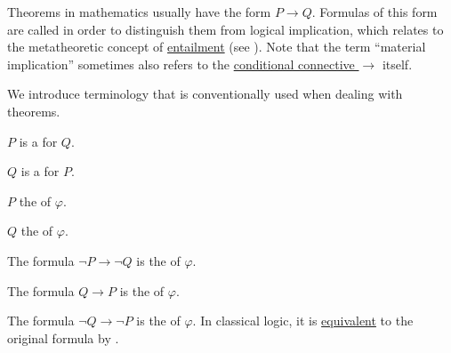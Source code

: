 \begin{definition}\label{def:material_implication}
  Theorems in mathematics usually have the form \( P \rightarrow Q \). Formulas of this form are called  in order to distinguish them from logical implication, which relates to the metatheoretic concept of \hyperref[def:propositional_semantics/entailment]{entailment} (see \cite{MathSE:material_vs_logical_implication}). Note that the term \enquote{material implication} sometimes also refers to the \hyperref[def:propositional_language/connectives/conditional]{conditional connective \( \rightarrow \)} itself.

  We introduce terminology that is conventionally used when dealing with theorems.

  \begin{thmenum}
     \( P \) is a  for \( Q \).

     \( Q \) is a  for \( P \).

     \( P \) the  of \( \varphi \).

     \( Q \) the  of \( \varphi \).

     The formula \( \neg P \rightarrow \neg Q \) is the  of \( \varphi \).

     The formula \( Q \rightarrow P \) is the  of \( \varphi \).

     The formula \( \neg Q \rightarrow \neg P \) is the  of \( \varphi \). In classical logic, it is \hyperref[def:propositional_semantics/equivalence]{equivalent} to the original formula by .
  \end{thmenum}
\end{definition}

